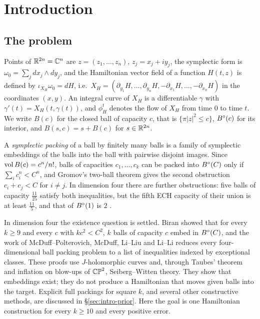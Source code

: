 \section{Introduction}\label{sec:intro}

\subsection{The problem}\label{sec:intro-problem}

Points of $\mathbb{R}^{2n}=\mathbb{C}^n$ are $z=(z_1,\dots,z_n)$, $z_j=x_j+iy_j$, the symplectic form is
$\omega_0=\sum_jdx_j\wedge dy_j$, and the Hamiltonian vector field of a function $H(t,z)$ is defined by
$\iota_{X_H}\omega_0=dH$, i.e.\ $X_H=(\partial_{y_1}H,\dots,\partial_{y_n}H,-\partial_{x_1}H,\dots,
-\partial_{x_n}H)$ in the coordinates $(x,y)$. An integral curve of $X_H$ is a differentiable
$\gamma$ with $\gamma'(t)=X_H(t,\gamma(t))$, and $\phi^t_H$ denotes the flow of $X_H$ from time $0$ to
time $t$. We write $B(c)$ for the closed ball of capacity $c$, that is $\{\pi|z|^2\le c\}$, $B^{\circ}(c)$ for its interior,
and $B(s,c)=s+B(c)$ for $s\in\mathbb{R}^{2n}$.

A \emph{symplectic packing} of a ball by finitely many balls is a family of symplectic embeddings of the balls into
the ball with pairwise disjoint images. Since $\operatorname{vol} B(c)=c^n/n!$, balls of capacities $c_1,\dots,c_k$ can be packed
into $B^{\circ}(C)$ only if $\sum_ic_i^n<C^n$, and Gromov's two-ball theorem \cite{Gromov1985} gives the second obstruction
$c_i+c_j<C$ for $i\ne j$. In dimension four there are further obstructions: five balls of capacity $\frac{11}{25}$
satisfy both inequalities, but the fifth ECH capacity of their union is at least $\frac{11}5$, and that of $B^{\circ}(1)$ is
$2$ \cite{Hutchings2011}.

In dimension four the existence question is settled. Biran \cite{Biran1997} showed that for every $k\ge9$ and every $c$
with $kc^2<C^2$, $k$ balls of capacity $c$ embed in $B^{\circ}(C)$, and the work of McDuff--Polterovich, McDuff, Li--Liu and
Li--Li \cite{McDuffPolterovich1994,McDuff1998,LiLiu2001,LiLi2002} reduces every four-dimensional ball packing problem to
a list of inequalities indexed by exceptional classes. These proofs use $J$-holomorphic curves and, through Taubes'
theorem and inflation on blow-ups of $\mathbb{CP}^2$, Seiberg--Witten theory. They show that embeddings exist; they do not
produce a Hamiltonian that moves given balls into the target. Explicit full packings for square $k$, and several other constructive methods, are discussed in
\S\ref{sec:intro-prior}. Here the goal is one Hamiltonian construction for every $k\ge10$ and every positive error.

